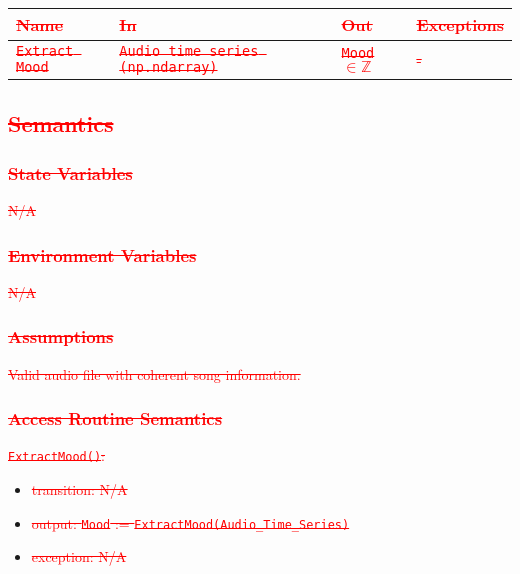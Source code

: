 \documentclass[12pt, titlepage]{article}
\begin{document}
\begin{center}
\begin{tabular}{p{2cm} p{4cm} p{4cm} p{2cm}}
\hline
\textcolor{red}{\sout{\textbf{Name}}} & \textcolor{red}{\sout{\textbf{In}}} & \textcolor{red}{\sout{\textbf{Out}}} & \textcolor{red}{\sout{\textbf{Exceptions}}}\\
\hline
\textcolor{red}{\sout{\texttt{Extract Mood}}} & \textcolor{red}{\sout{\texttt{Audio time series (np.ndarray)}}} & \textcolor{red}{\sout{\texttt{Mood} $\in{\mathbb{Z}}$}} & \textcolor{red}{\sout{-}}\\
\hline
\end{tabular}
\end{center}

\subsection{\textcolor{red}{\sout{Semantics}}}

\subsubsection{\textcolor{red}{\sout{State Variables}}}
\textcolor{red}{\sout{N/A}}

\subsubsection{\textcolor{red}{\sout{Environment Variables}}}
\textcolor{red}{\sout{N/A}}

\subsubsection{\textcolor{red}{\sout{Assumptions}}}
\textcolor{red}{\sout{Valid audio file with coherent song information.}}

\subsubsection{\textcolor{red}{\sout{Access Routine Semantics}}}

\noindent \textcolor{red}{\sout{\texttt{ExtractMood()}:}}
\begin{itemize}
\item \textcolor{red}{\sout{transition: N/A}}
\item \textcolor{red}{\sout{output: \texttt{Mood} := \texttt{ExtractMood(Audio\_Time\_Series)}}}
\item \textcolor{red}{\sout{exception: N/A}}
\end{itemize}
\end{document}
